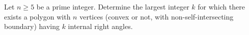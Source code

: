 Let $n \geq 5$ be a prime integer. Determine the largest integer $k$ for which there exists a polygon with $n$ vertices (convex or not, with non-self-intersecting boundary) having $k$ internal right angles.
